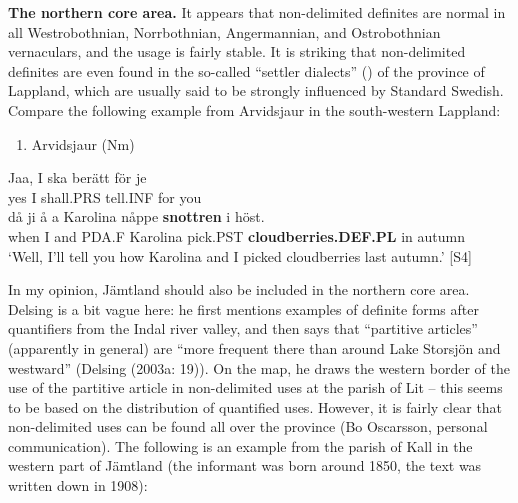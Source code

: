 \textbf{The northern core area. }It appears that non-delimited definites are normal in all Westrobothnian, Norrbothnian, Angermannian, and Ostrobothnian vernaculars, and the usage is fairly stable. It is striking that non-delimited definites are even found in the so-called “settler dialects” () of the province of Lappland, which are usually said to be strongly influenced by Standard Swedish. Compare the following example from Arvidsjaur in the south-western Lappland:

\begin{enumerate} %
\item 
Arvidsjaur (Nm)

\end{enumerate} %
\ea\label{}
\gll Jaa,  I  ska  berätt  för  je\\


yes  I  shall.PRS  tell.INF  for  you\\ %


\ea\label{}
\gll då  ji  å  a  Karolina  nåppe  \textbf{snottren} i  höst.\\


when  I  and  PDA.F  Karolina  pick.PST  \textbf{cloudberries.DEF.PL} in  autumn\\ %


‘Well, I’ll tell you how Karolina and I picked cloudberries last autumn.’\textsuperscript{ }[S4]
\z

In my opinion, Jämtland should also be included in the northern core area. Delsing is a bit vague here: he first mentions examples of definite forms after quantifiers from the Indal river valley, and then says that “partitive articles” (apparently in general) are “more frequent there than around Lake Storsjön and westward” (Delsing (2003a: 19)). On the map, he draws the western border of the use of the partitive article in non-delimited uses at the parish of Lit – this seems to be based on the distribution of quantified uses. However, it is fairly clear that non-delimited uses can be found all over the province (Bo Oscarsson, personal communication). The following is an example from the parish of Kall in the western part of Jämtland (the informant was born around 1850, the text was written down in 1908):

